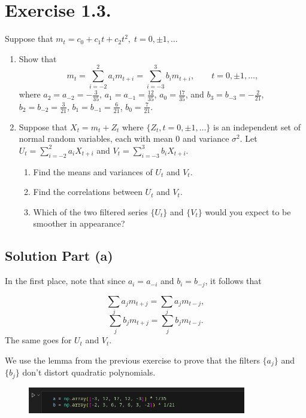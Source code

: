 \section*{Exercise 1.3.}

Suppose that $m_t = c_0 + c_1 t + c_2 t^2,\; t = 0,\pm 1,\ldots$
\begin{enumerate}[label=(\alph*)]
    \item Show that
    \[ m_t = \sum_{i = -2}^{2}a_i m_{t+i} = \sum_{i = -3}^{3}b_i m_{t+i},\hspace{2em} t = 0,\pm1,\ldots, \]
    where $a_2 = a_{-2}=-\frac{3}{35}$, $a_1 = a_{-1}=\frac{12}{35}$, $a_0 = \frac{17}{35}$, and $b_3 = b_{-3} = -\frac{2}{21}$, $b_2 = b_{-2} = \frac{3}{21}$, $b_1 = b_{-1} = \frac{6}{21}$, $b_0 = \frac{7}{21}$.
    \item Suppose that $X_t = m_t + Z_t$ where $\{Z_t, t = 0,\pm 1,\ldots\}$ is an independent set of normal random variables, each with mean 0 and variance $\sigma^2$. Let $U_t = \sum_{i = -2}^2 a_i X_{t+i}$ and $V_t = \sum_{i = -3}^3 b_i X_{t+i}$.
    \begin{enumerate}[label=(\roman*)]
        \item Find the means and variances of $U_t$ and $V_t$.
        \item Find the correlations between $U_t$ and $V_t$.
        \item Which of the two filtered series $\{U_t\}$ and $\{V_t\}$ would you expect to be smoother in appearance?
    \end{enumerate}
\end{enumerate}

\subsection*{Solution Part (a)}

In the first place, note that since $a_i = a_{-i}$ and $b_i = b_{-j}$, it follows that

\[ \sum_j a_j m_{t+j} =  \sum_j a_j m_{t-j}, \]
\[ \sum_j b_j m_{t+j} =  \sum_j b_j m_{t-j}. \]
The same goes for $U_t$ and $V_t$.

We use the lemma from the previous exercise to prove that the filters $\{a_j\}$ and $\{b_j\}$ don't distort quadratic polynomials.

\begin{figure}[H]
    \centering
    \includegraphics[width=0.85\textwidth]{../pictures/hw1ex1.3.0.png}
\end{figure}

